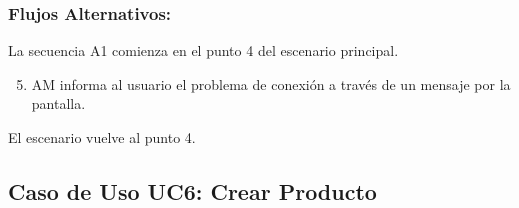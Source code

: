 \begin{framed}
\subsubsection{Flujos Alternativos: }

La secuencia A1 comienza en el punto 4 del escenario principal.
\begin{enumerate}
    \setcounter{enumi}{4}
    \item AM informa al usuario el problema de conexión a través de un mensaje por la pantalla.
\end{enumerate}
El escenario vuelve al punto 4.

\end{framed}


\subsection{Caso de Uso UC6: Crear Producto}

